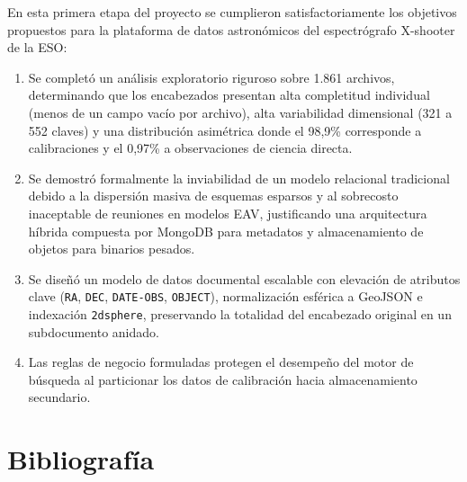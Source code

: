 \documentclass[10pt]{article}
\begin{document}
En esta primera etapa del proyecto se cumplieron satisfactoriamente los objetivos propuestos para la plataforma de datos astronómicos del espectrógrafo X-shooter de la ESO:
\begin{enumerate}
    \item Se completó un análisis exploratorio riguroso sobre 1.861 archivos, determinando que los encabezados presentan alta completitud individual (menos de un campo vacío por archivo), alta variabilidad dimensional (321 a 552 claves) y una distribución asimétrica donde el 98,9\% corresponde a calibraciones y el 0,97\% a observaciones de ciencia directa.
    \item Se demostró formalmente la inviabilidad de un modelo relacional tradicional debido a la dispersión masiva de esquemas esparsos y al sobrecosto inaceptable de reuniones en modelos EAV, justificando una arquitectura híbrida compuesta por MongoDB para metadatos y almacenamiento de objetos para binarios pesados.
    \item Se diseñó un modelo de datos documental escalable con elevación de atributos clave (\texttt{RA}, \texttt{DEC}, \texttt{DATE-OBS}, \texttt{OBJECT}), normalización esférica a GeoJSON e indexación \texttt{2dsphere}, preservando la totalidad del encabezado original en un subdocumento anidado.
    \item Las reglas de negocio formuladas protegen el desempeño del motor de búsqueda al particionar los datos de calibración hacia almacenamiento secundario.
\end{enumerate}

\section{Bibliografía}\label{sec:bibliografia}
\end{document}
